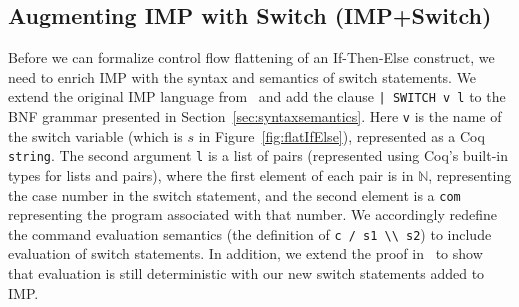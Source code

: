\documentclass[compsoc,conference,a4paper,10pt,times]{IEEEtran}
\begin{document}
\subsection{Augmenting IMP with Switch (IMP+Switch)}\label{4.2}
%


%
%
%
Before we can formalize control flow flattening of an If-Then-Else construct, we need to enrich IMP with the syntax and semantics of switch statements. We extend the original IMP language from~\cite{SFV2} and add the clause \texttt{| SWITCH v l} to the BNF grammar presented in Section~\ref{sec:syntaxsemantics}.  Here \texttt{v} is the name of the switch variable (which is $s$ in Figure~\ref{fig:flatIfElse}), represented as a Coq \texttt{string}.  The second argument \texttt{l} is a list of pairs (represented using Coq's built-in types for lists and pairs), where the first element of each pair is in $\mathbb{N}$, representing the case number in the switch statement, and the second element is a \texttt{com} representing the program associated with that number.
We accordingly redefine the command evaluation semantics (the definition of \verb|c / s1 \\ s2|) to include evaluation of switch statements.  In addition, we extend the proof in~\cite{SFV2} to show that evaluation is still deterministic with our new switch statements added to IMP.
\end{document}
